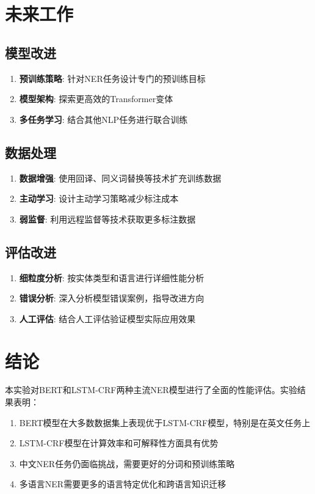 \documentclass[12pt,a4paper]{article}
\begin{document}
\section{未来工作}

\subsection{模型改进}
\begin{enumerate}
    \item \textbf{预训练策略}: 针对NER任务设计专门的预训练目标
    \item \textbf{模型架构}: 探索更高效的Transformer变体
    \item \textbf{多任务学习}: 结合其他NLP任务进行联合训练
\end{enumerate}

\subsection{数据处理}
\begin{enumerate}
    \item \textbf{数据增强}: 使用回译、同义词替换等技术扩充训练数据
    \item \textbf{主动学习}: 设计主动学习策略减少标注成本
    \item \textbf{弱监督}: 利用远程监督等技术获取更多标注数据
\end{enumerate}

\subsection{评估改进}
\begin{enumerate}
    \item \textbf{细粒度分析}: 按实体类型和语言进行详细性能分析
    \item \textbf{错误分析}: 深入分析模型错误案例，指导改进方向
    \item \textbf{人工评估}: 结合人工评估验证模型实际应用效果
\end{enumerate}

\section{结论}

本实验对BERT和LSTM-CRF两种主流NER模型进行了全面的性能评估。实验结果表明：

\begin{enumerate}
    \item BERT模型在大多数数据集上表现优于LSTM-CRF模型，特别是在英文任务上
    \item LSTM-CRF模型在计算效率和可解释性方面具有优势
    \item 中文NER任务仍面临挑战，需要更好的分词和预训练策略
    \item 多语言NER需要更多的语言特定优化和跨语言知识迁移
\end{enumerate}
\end{document}
